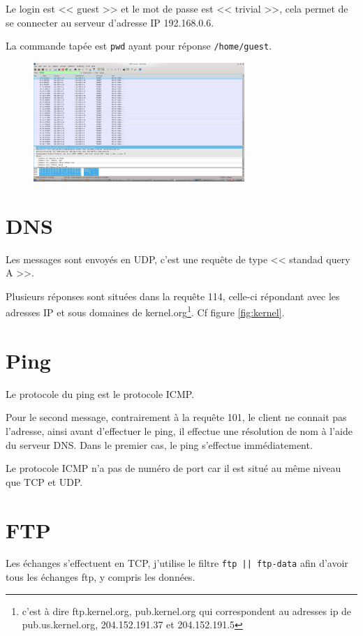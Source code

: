 \documentclass[12pt,a4paper,openany]{article}
\begin{document}
	Le login est << guest >> et le mot de passe est << trivial >>, cela permet de se connecter au serveur d'adresse IP 192.168.0.6.

	La commande tapée est \texttt{pwd} ayant pour réponse \texttt{/home/guest}. 

	\begin{figure}[H]
		\centering
		\includegraphics[width=8cm]{capture3.jpeg}
	\end{figure}

	\section{DNS}
	Les messages sont envoyés en UDP, c'est une requête de type << standad query A >>.

	Plusieurs réponses sont situées dans la requête 114, celle-ci répondant avec les adresses IP et sous domaines de kernel.org\footnote{c'est à dire
	ftp.kernel.org, pub.kernel.org qui correspondent au adresses ip de pub.us.kernel.org, 204.152.191.37 et 204.152.191.5}. Cf figure \ref{fig:kernel}.

	\section{Ping}
	Le protocole du ping est le protocole ICMP.

	Pour le second message, contrairement à la requête 101, le client ne connait pas l'adresse, ainsi avant d'effectuer le ping, il effectue une
	résolution de nom à l'aide du serveur DNS. Dans le premier cas, le ping s'effectue immédiatement.
	
	Le protocole ICMP n'a pas de numéro de port car il est situé au même niveau que TCP et UDP.

	\section{FTP}
	Les échanges s'effectuent en TCP, j'utilise le filtre \texttt{ftp || ftp-data} afin d'avoir tous les échanges ftp, y compris les données.
\end{document}
